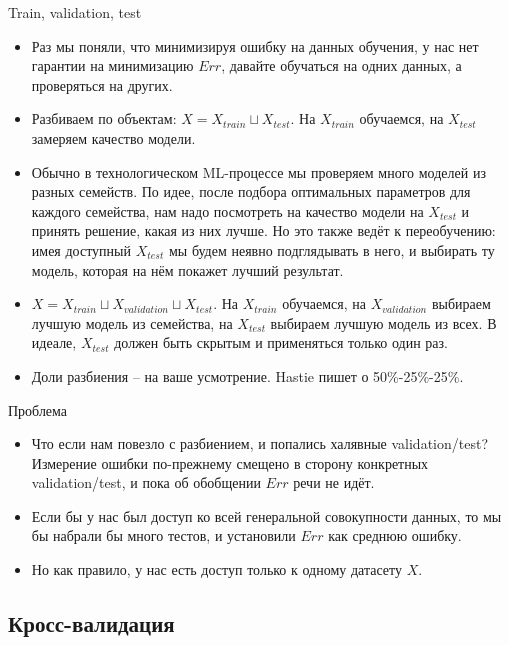 \documentclass[9pt]{beamer}
\begin{document}
\begin{frame}{Train, validation, test}
    \begin{itemize}
        \item Раз мы поняли, что минимизируя ошибку на данных обучения, у нас нет гарантии на минимизацию $Err$, давайте обучаться на одних данных, а проверяться на других.
        \item Разбиваем по объектам: $X = X_{train} \sqcup X_{test}$. На $X_{train}$ обучаемся, на $X_{test}$ замеряем качество модели. 
        \item Обычно в технологическом ML-процессе мы проверяем много моделей из разных семейств. По идее, после подбора оптимальных параметров для каждого семейства, нам надо посмотреть на качество модели на $X_{test}$ и принять решение, какая из них лучше. Но это также ведёт к переобучению: имея доступный $X_{test}$ мы будем неявно подглядывать в него, и выбирать ту модель, которая на нём покажет лучший результат.
        \item $X = X_{train} \sqcup X_{validation} \sqcup X_{test}$. На $X_{train}$ обучаемся, на $X_{validation}$ выбираем лучшую модель из семейства, на $X_{test}$ выбираем лучшую модель из всех. В идеале, $X_{test}$ должен быть скрытым и применяться только один раз.
        \item Доли разбиения -- на ваше усмотрение. Hastie пишет о 50\%-25\%-25\%.
    \end{itemize}
\end{frame}

\begin{frame}{Проблема}
\begin{itemize}
    \item Что если нам повезло с разбиением, и попались халявные validation/test? Измерение ошибки по-прежнему смещено в сторону конкретных validation/test, и пока об обобщении $Err$ речи не идёт.
    \item Если бы у нас был доступ ко всей генеральной совокупности данных, то мы бы набрали бы много тестов, и установили $Err$ как среднюю ошибку.
    \item Но как правило, у нас есть доступ только к одному датасету $X$.
\end{itemize}
\end{frame}

\subsection{Кросс-валидация}
\end{document}
